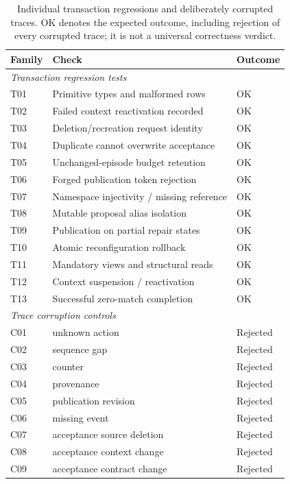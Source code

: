 \documentclass[pdflatex,sn-mathphys-num]{sn-jnl}
\theoremstyle{thmstyleone}
\theoremstyle{thmstylethree}
\theoremstyle{thmstyletwo}
\begin{document}
\begin{table}[tbp]
\centering
\caption{Individual transaction regressions and deliberately corrupted traces. OK denotes the expected outcome, including rejection of every corrupted trace; it is not a universal correctness verdict.}\label{tab:negative-controls}
\footnotesize
\setlength{\tabcolsep}{3pt}
\renewcommand{\arraystretch}{1.13}
\begin{tabularx}{\linewidth}{@{}lXl@{}}\toprule
Family & Check & Outcome\\\midrule
\multicolumn{3}{l}{\textit{Transaction regression tests}}\\
T01 & Primitive types and malformed rows & OK\\
T02 & Failed context reactivation recorded & OK\\
T03 & Deletion/recreation request identity & OK\\
T04 & Duplicate cannot overwrite acceptance & OK\\
T05 & Unchanged-episode budget retention & OK\\
T06 & Forged publication token rejection & OK\\
T07 & Namespace injectivity / missing reference & OK\\
T08 & Mutable proposal alias isolation & OK\\
T09 & Publication on partial repair states & OK\\
T10 & Atomic reconfiguration rollback & OK\\
T11 & Mandatory views and structural reads & OK\\
T12 & Context suspension / reactivation & OK\\
T13 & Successful zero-match completion & OK\\
\midrule\multicolumn{3}{l}{\textit{Trace corruption controls}}\\
C01 & unknown action & Rejected\\
C02 & sequence gap & Rejected\\
C03 & counter & Rejected\\
C04 & provenance & Rejected\\
C05 & publication revision & Rejected\\
C06 & missing event & Rejected\\
C07 & acceptance source deletion & Rejected\\
C08 & acceptance context change & Rejected\\
C09 & acceptance contract change & Rejected\\
\bottomrule\end{tabularx}
\end{table}
\end{document}
